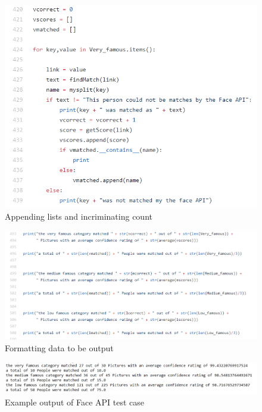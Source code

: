 \documentclass[12pt,a4paper]{article}
\begin{document}
\begin{figure}[!ht]
    \centering
    \includegraphics[width=1.0\textwidth]{Figs/faceevalcode2.PNG} 
    \caption{Appending lists and incriminating count} 
    \label{fec2}
\end{figure} 

\begin{figure}[!ht]
    \centering
    \includegraphics[width=1.0\textwidth]{Figs/faceevalcode3.PNG} 
    \caption{Formatting data to be output} 
    \label{fec3}
\end{figure} 

\begin{figure}[!ht]
    \centering
    \includegraphics[width=1.0\textwidth]{Figs/faceevaloutput.PNG} 
    \caption{Example output of Face API test case} 
    \label{feo}
\end{figure} 
\end{document}
